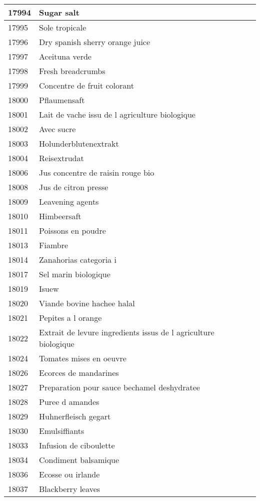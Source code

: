 \begin{longtable}{|l|l|}
17994 & Sugar salt \\ \hline 
17995 & Sole tropicale \\ \hline 
17996 & Dry spanish sherry orange juice \\ \hline 
17997 & Aceituna verde \\ \hline 
17998 & Fresh breadcrumbs \\ \hline 
17999 & Concentre de fruit colorant \\ \hline 
18000 & Pflaumensaft \\ \hline 
18001 & Lait de vache issu de l agriculture biologique \\ \hline 
18002 & Avec sucre \\ \hline 
18003 & Holunderblutenextrakt \\ \hline 
18004 & Reisextrudat \\ \hline 
18006 & Jus concentre de raisin rouge bio \\ \hline 
18008 & Jus de citron presse \\ \hline 
18009 & Leavening agents \\ \hline 
18010 & Himbeersaft \\ \hline 
18011 & Poissons en poudre \\ \hline 
18013 & Fiambre \\ \hline 
18014 & Zanahorias categoria i \\ \hline 
18017 & Sel marin biologique \\ \hline 
18019 & Isuew \\ \hline 
18020 & Viande bovine hachee halal \\ \hline 
18021 & Pepites a l orange \\ \hline 
18022 & Extrait de levure  ingredients issus de l agriculture biologique \\ \hline 
18024 & Tomates mises en oeuvre \\ \hline 
18026 & Ecorces de mandarines \\ \hline 
18027 & Preparation pour sauce bechamel deshydratee \\ \hline 
18028 & Puree d amandes \\ \hline 
18029 & Huhnerfleisch gegart \\ \hline 
18030 & Emulsiffiants \\ \hline 
18033 & Infusion de ciboulette \\ \hline 
18034 & Condiment balsamique \\ \hline 
18036 & Ecosse ou irlande \\ \hline 
18037 & Blackberry leaves \\ \hline 

\end{longtable}
